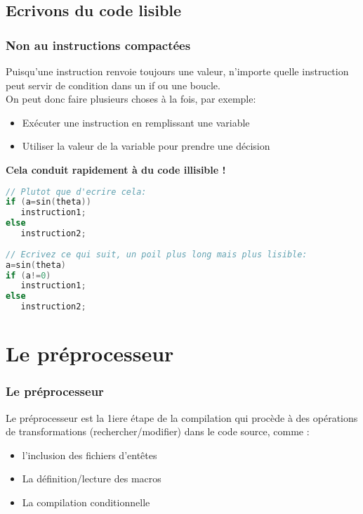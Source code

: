 \documentclass{beamer}
\begin{document}
\subsection{Ecrivons du code lisible}

\begin{frame}[fragile=singleslide,shrink=20]
\frametitle {Non au instructions compactées}
Puisqu'une instruction renvoie toujours une valeur, n'importe quelle instruction peut servir de condition dans un if ou une boucle.\\
On peut donc faire plusieurs choses à la fois, par exemple:
\begin{itemize}
\item{Exécuter une instruction en remplissant une variable}
\item{Utiliser la valeur de la variable pour prendre une décision}
\end{itemize}

\textbf{Cela conduit rapidement à du code illisible !}

\begin{lstlisting}[language=c++]
// Plutot que d'ecrire cela:
if (a=sin(theta))
   instruction1;
else
   instruction2;
   
// Ecrivez ce qui suit, un poil plus long mais plus lisible:
a=sin(theta)
if (a!=0)
   instruction1;
else
   instruction2;
\end{lstlisting}
\end{frame}

\section{Le préprocesseur}

\begin{frame}[fragile=singleslide,shrink=20]
\frametitle {Le préprocesseur}

\;


Le préprocesseur est la 1iere étape de la compilation qui procède à des opérations de transformations (rechercher/modifier) dans le code source, comme :

\begin{itemize}
\item{l'inclusion des fichiers d'entêtes }
\item{La définition/lecture des macros}
\item{La compilation conditionnelle}
\end{itemize}


\end{frame}
\end{document}

